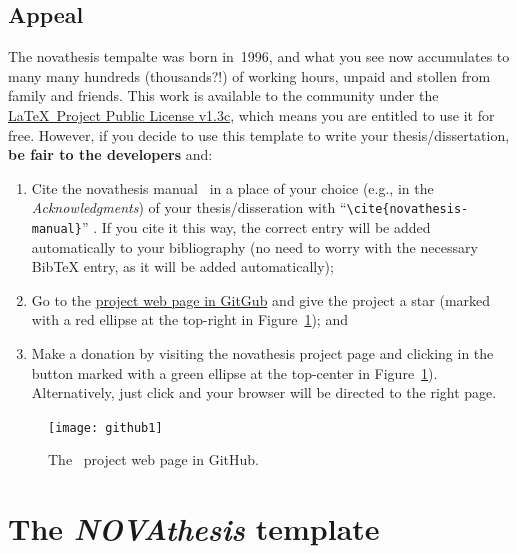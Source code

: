 \subsection{Appeal}
\label{sub:appeal}

The \gls{novathesis} tempalte was born in~1996, and what you see now accumulates to many many hundreds (thousands?!) of working hours, unpaid and stollen from family and friends.  This work is available to the community under the \href{LaTeX project public license}{\LaTeX\ Project Public License v1.3c}, which means you are entitled to use it for free.  However, if you decide to use this template to write your thesis/dissertation, \textbf{be fair to the developers} and:
\begin{enumerate}
  \item Cite the \gls{novathesis} manual~\cite{novathesis-manual} in a place of your choice (e.g., in the \emph{Acknowledgments}) of your thesis/disseration with “\verb!\cite{novathesis-manual}!” .  If you cite it this way, the correct entry will be added automatically to your bibliography (no need to worry with the necessary BibTeX entry, as it will be added automatically);
  \item Go to the
\href{https://github.com/joaomlourenco/novathesis}{project web page in GitGub} and give the project a star (marked with a red ellipse at the top-right in Figure~\ref{fig:github}); and
  \item Make a donation by visiting the \gls{novathesis} project page and clicking in the button marked with a green ellipse at the top-center in Figure~\ref{fig:github}).  Alternatively, just click \href{https://www.paypal.com/donate/?hosted_button_id=8WA8FRVMB78W8}{} and your browser will be directed to the right page.
\end{enumerate}

\begin{figure}[htbp]
  \centering
    \texttt{[image: github1]}
  \caption{The \novathesis\ project web page in GitHub.}
  \label{fig:github}
\end{figure}


\section{The \emph{NOVAthesis} template}
\label{sec:a_bit_of_history}

\newcommand{\mysmallcoversize}{0.09\linewidth}
\renewcommand{\theadfont}{\large\bfseries}
\newtoggle{ntRow}

